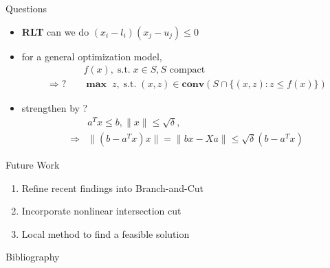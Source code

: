 \documentclass[aspectratio=1610, 10pt]{beamer}
\newcommand{\mx}{\mathbf{\max}\;}
\newcommand{\st}{\mathrm{s.t.\;}}
\newcommand{\conv}{\mathbf{conv}}
\begin{document}
\begin{frame}{Questions}

  \begin{itemize}
    \item \textbf{RLT} can we do \((x_i - l_i)(x_j - u_j) \le 0\)
    \item for a general optimization model,
          \begin{align*}
                                & f(x), \;  \st  x \in S, S \text{ compact}                      \\
            \Rightarrow ? \quad & \mx z, \; \st (x, z) \in \conv (S \cap \{(x, z): z \le f(x)\})
          \end{align*}
    \item strengthen by \cite{ye_new_2003} ?
          \begin{align*}
                        & a^Tx \le b, \|x\| \le \sqrt\delta,                     \\
            \Rightarrow & \|(b - a^Tx)x\| = \|bx - Xa\| \le \sqrt\delta (b-a^Tx)
          \end{align*}
  \end{itemize}
\end{frame}
\begin{frame}{Future Work}
  \begin{enumerate}
    \item Refine recent findings into Branch-and-Cut
    \item Incorporate nonlinear intersection cut
    \item Local method to find a feasible solution
  \end{enumerate}
\end{frame}
\begin{frame}[allowframebreaks]{Bibliography}
  
  
\end{frame}
\end{document}
